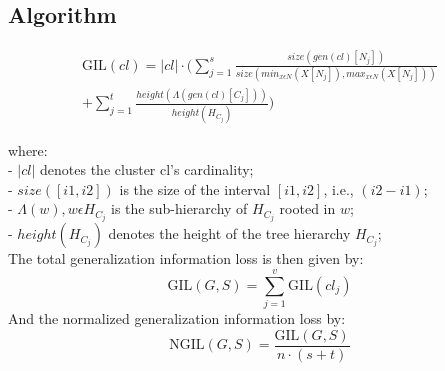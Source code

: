 \documentclass{llncs}
\providecommand{\abs}[1]{\lvert#1\rvert}
\begin{document}
\subsection{Algorithm}
\label{ssect:algorithm}


\begin{equation*}
\begin{split}
\text{GIL}(cl) = \abs{cl} \cdot (\sum_{j=1}^{s} \frac{size(gen(cl)[N_j])}{size(min_{x \epsilon N} (X[N_j]), max_{x \epsilon N} (X[N_j]))} \\ 
+ \sum_{j=1}^{t} \frac{height(\Lambda(gen(cl)[C_j]))}{height(H_{C_j})})    
\end{split}    
\end{equation*}


where:\\
- $\abs{cl}$ denotes the cluster cl's cardinality; \\
- $size([i1,i2])$ is the size of the interval $[i1,i2]$, i.e., $(i2-i1)$; \\
- $\Lambda(w), w \epsilon H_{C_j}$ is the sub-hierarchy of $H_{C_j}$ rooted in $w$; \\
- $height(H_{C_j})$ denotes the height of the tree hierarchy $H_{C_j}$; \\


The total generalization information loss is then given by:
\begin{equation*}
\text{GIL}(G,S) = \sum_{j=1}^{v} \text{GIL}(cl_j)
\end{equation*}
And the normalized generalization information loss by:
\begin{equation*}
\text{NGIL}(G,S) = \frac{\text{GIL}(G,S)}{n \cdot (s+t)}
\end{equation*}

\end{document}
